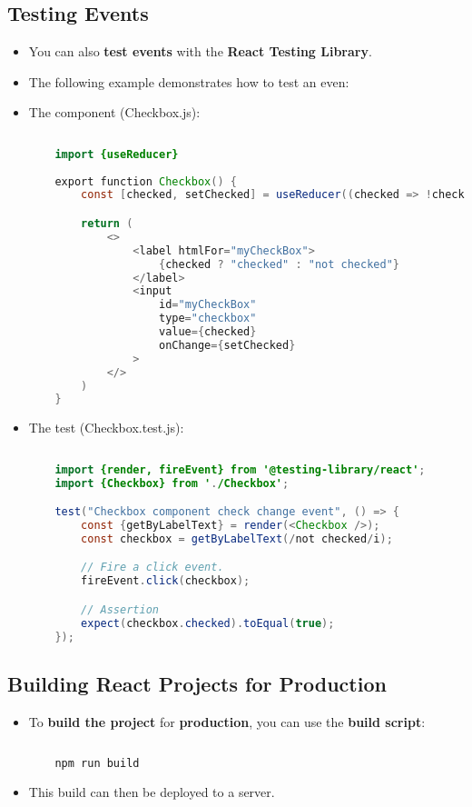 \documentclass{article}
\begin{document}
    \subsection*{Testing Events}
    \begin{itemize}
        \item You can also \textbf{test events} with the \textbf{React Testing Library}.
        \item The following example demonstrates how to test an even:
        \item[] The component (Checkbox.js):
        \begin{lstlisting}[language=Java]
    
    import {useReducer}
    
    export function Checkbox() {
        const [checked, setChecked] = useReducer((checked => !checked), false);

        return (
            <>
                <label htmlFor="myCheckBox">
                    {checked ? "checked" : "not checked"}
                </label>
                <input
                    id="myCheckBox"
                    type="checkbox"
                    value={checked}
                    onChange={setChecked}
                >
            </>
        )
    }
        \end{lstlisting}
        \item[] The test (Checkbox.test.js):
        \begin{lstlisting}[language=Java]
    
    import {render, fireEvent} from '@testing-library/react';
    import {Checkbox} from './Checkbox';

    test("Checkbox component check change event", () => {
        const {getByLabelText} = render(<Checkbox />);
        const checkbox = getByLabelText(/not checked/i);

        // Fire a click event.
        fireEvent.click(checkbox);

        // Assertion
        expect(checkbox.checked).toEqual(true);
    });
        \end{lstlisting}
    \end{itemize}

    \subsection*{Building React Projects for Production}
    \begin{itemize}
        \item To \textbf{build the project} for \textbf{production}, you can use the \textbf{build script}:
        \begin{lstlisting}[language=Bash]
            
    npm run build
        \end{lstlisting}
        \item This build can then be deployed to a server.
    \end{itemize}
\end{document}
